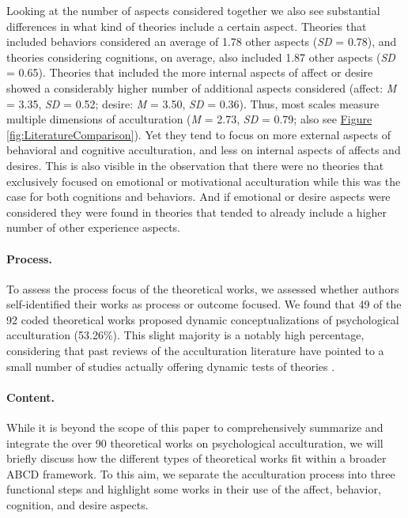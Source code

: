 \documentclass[man, 12pt, a4paper, mask]{apa7}
\newcommand{\fgrref}[2][]{\hyperref[#2]{Figure \ref*{#2}#1}}
\begin{document}
Looking at the number of aspects considered together we also see
substantial differences in what kind of theories include a certain
aspect. Theories that included behaviors considered an average of 1.78
other aspects (\textit{SD} = 0.78), and theories considering cognitions,
on average, also included 1.87 other aspects (\textit{SD} = 0.65).
Theories that included the more internal aspects of affect or desire
showed a considerably higher number of additional aspects considered
(affect: \textit{M} = 3.35, \textit{SD} = 0.52; desire: \textit{M} =
3.50, \textit{SD} = 0.36). Thus, most scales measure multiple dimensions
of acculturation (\textit{M} = 2.73, \textit{SD} = 0.79; also see
\fgrref{fig:LiteratureComparison}). Yet they tend to focus on more
external aspects of behavioral and cognitive acculturation, and less on
internal aspects of affects and desires. This is also visible in the
observation that there were no theories that exclusively focused on
emotional or motivational acculturation while this was the case for both
cognitions and behaviors. And if emotional or desire aspects were
considered they were found in theories that tended to already include a
higher number of other experience aspects.

\paragraph{Process.}

To assess the process focus of the theoretical works, we assessed
whether authors self-identified their works as process or outcome
focused. We found that 49 of the 92 coded theoretical works proposed
dynamic conceptualizations of psychological acculturation (53.26\%).
This slight majority is a notably high percentage, considering that past
reviews of the acculturation literature have pointed to a small number
of studies actually offering dynamic tests of theories
\citep[e.g.,][]{Brown2011, Ward2019}.

\paragraph{Content.}

While it is beyond the scope of this paper to comprehensively summarize
and integrate the over 90 theoretical works on psychological
acculturation, we will briefly discuss how the different types of
theoretical works fit within a broader ABCD framework. To this aim, we
separate the acculturation process into three functional steps and
highlight some works in their use of the affect, behavior, cognition,
and desire aspects.
\end{document}
